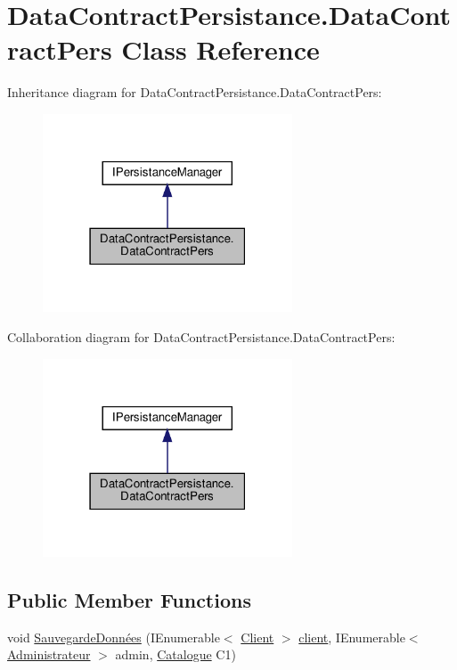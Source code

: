 \hypertarget{classDataContractPersistance_1_1DataContractPers}{}\section{Data\+Contract\+Persistance.\+Data\+Contract\+Pers Class Reference}
\label{classDataContractPersistance_1_1DataContractPers}


Inheritance diagram for Data\+Contract\+Persistance.\+Data\+Contract\+Pers\+:
\nopagebreak
\begin{figure}[H]
\begin{center}
\leavevmode
\includegraphics[width=210pt]{classDataContractPersistance_1_1DataContractPers__inherit__graph}
\end{center}
\end{figure}


Collaboration diagram for Data\+Contract\+Persistance.\+Data\+Contract\+Pers\+:
\nopagebreak
\begin{figure}[H]
\begin{center}
\leavevmode
\includegraphics[width=210pt]{classDataContractPersistance_1_1DataContractPers__coll__graph}
\end{center}
\end{figure}
\subsection*{Public Member Functions}
\begin{DoxyCompactItemize}
\item 
void \hyperlink{classDataContractPersistance_1_1DataContractPers_aa2ef70839fd63f14fab9aca02bd42528}{Sauvegarde\+Données} (I\+Enumerable$<$ \hyperlink{classModele_1_1Client}{Client} $>$ \hyperlink{classDataContractPersistance_1_1DataContractPers_a397297f0e263edc3771ed782292666ae}{client}, I\+Enumerable$<$ \hyperlink{classModele_1_1Administrateur}{Administrateur} $>$ admin, \hyperlink{classModele_1_1Catalogue}{Catalogue} C1)
\end{DoxyCompactItemize}
